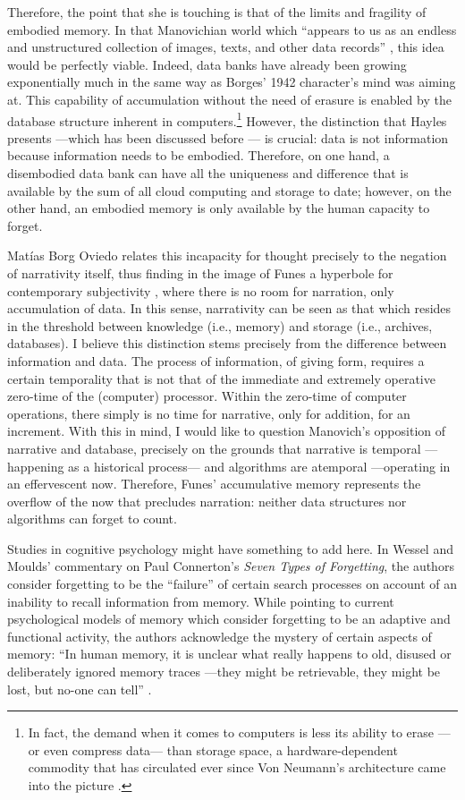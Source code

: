 Therefore, the point that she is touching is that of the limits and fragility of embodied memory. In that Manovichian world which ``appears to us as an endless and unstructured collection of images, texts, and other data records'' \parencite[219]{Man01:The}, this idea would be perfectly viable. Indeed, data banks have already been growing exponentially much in the same way as Borges' 1942 character's mind was aiming at. This capability of accumulation without the need of erasure is enabled by the database structure inherent in computers.\footnote{In fact, the demand when it comes to computers is less its ability to erase ---or even compress data--- than storage space, a hardware-dependent commodity that has circulated ever since Von Neumann's architecture came into the picture .} However, the distinction that Hayles presents ---which has been discussed before --- is crucial: data is not information because information needs to be embodied. Therefore, on one hand, a disembodied data bank can have all the uniqueness and difference that is available by the sum of all cloud computing and storage to date; however, on the other hand, an embodied memory is only available by the human capacity to forget. 

Matías Borg Oviedo \parencite{Ovi19:Mem} relates this incapacity for thought precisely to the negation of narrativity itself, thus finding in the image of Funes a hyperbole for contemporary subjectivity \parencite[5]{Ovi19:Mem}, where there is no room for narration, only accumulation of data. In this sense, narrativity can be seen as that which resides in the threshold between knowledge (i.e., memory) and storage (i.e., archives, databases). I believe this distinction stems precisely from the difference between information and data. The process of information, of giving form, requires a certain temporality that is not that of the immediate and extremely operative zero-time of the (computer) processor. Within the zero-time of computer operations, there simply is no time for narrative, only for addition, for an increment. With this in mind, I would like to question Manovich's opposition of narrative and database, precisely on the grounds that narrative is temporal ---happening as a historical process--- and algorithms are atemporal ---operating in an effervescent now. Therefore, Funes' accumulative memory represents the overflow of the now that precludes narration: neither data structures nor algorithms can forget to count.

Studies in cognitive psychology might have something to add here. In Wessel and Moulds' commentary \parencite{Wes08:How} on Paul Connerton's \textit{Seven Types of Forgetting}, the authors consider forgetting to be the ``failure'' of certain search processes on account of an inability to recall information from memory. While pointing to current psychological models of memory which consider forgetting to be an adaptive and functional activity, the authors acknowledge the mystery of certain aspects of memory: ``In human memory, it is unclear what really happens to old, disused or deliberately ignored memory traces ---they might be retrievable, they might be lost, but no-one can tell'' \parencite[292]{Wes08:How}.

